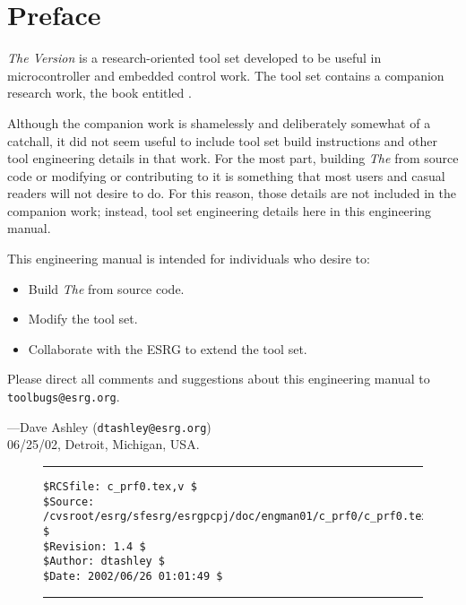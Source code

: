 \chapter{Preface}

\emph{The \tsname{} Version \tsversion{}} is a research-oriented tool set
developed to be useful in microcontroller and embedded control work.
The tool set contains a companion research work, the book entitled
\emph{\compbooktitlelong}.

Although the companion work is shamelessly and
deliberately somewhat of a catchall, it did not
seem useful to include tool set build instructions and other tool
engineering details in that work.  For the most part, building
\emph{The \tsname{}} from source code or modifying or contributing to
it is something that most users and casual readers will not
desire to do.  For this reason, those details are not
included in the companion work; instead, tool set engineering 
details here in this engineering manual.

This engineering manual is intended for individuals who desire
to:

\begin{itemize}
\item Build \emph{The \tsname{}} from source code.
\item Modify the tool set.
\item Collaborate with the ESRG to extend the tool set. 
\end{itemize}

Please direct all comments and suggestions about this engineering
manual to \texttt{toolbugs@esrg.org}.

\vspace{4mm}

\noindent{}---Dave Ashley (\texttt{dtashley@esrg.org}) \\
06/25/02, Detroit, Michigan, USA.


\noindent\begin{figure}[!b]
\noindent\rule[-0.25in]{\textwidth}{1pt}
\begin{tiny}
\begin{verbatim}
$RCSfile: c_prf0.tex,v $
$Source: /cvsroot/esrg/sfesrg/esrgpcpj/doc/engman01/c_prf0/c_prf0.tex,v $
$Revision: 1.4 $
$Author: dtashley $
$Date: 2002/06/26 01:01:49 $
\end{verbatim}
\end{tiny}
\noindent\rule[0.25in]{\textwidth}{1pt}
\end{figure}
%
%
%
